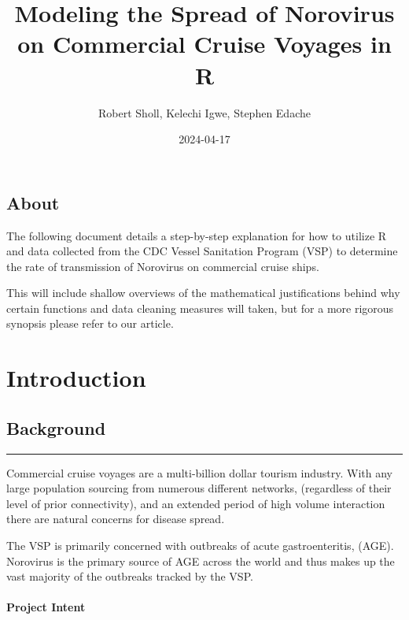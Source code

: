 \documentclass[
  11,
]{book}
\title{Modeling the Spread of Norovirus on Commercial Cruise Voyages in R}
\author{Robert Sholl, Kelechi Igwe, Stephen Edache}
\date{2024-04-17}
\begin{document}
\maketitle

{
\setcounter{tocdepth}{2}
\tableofcontents
}
\hypertarget{about}{%
\chapter*{About}\label{about}}


The following document details a step-by-step explanation for how to utilize R and data collected from the CDC Vessel Sanitation Program (VSP) to determine the rate of transmission of Norovirus on commercial cruise ships.

This will include shallow overviews of the mathematical justifications behind why certain functions and data cleaning measures will taken, but for a more rigorous synopsis please refer to our article.

\hypertarget{part-introduction}{%
\part{Introduction}\label{part-introduction}}

\hypertarget{background}{%
\chapter*{Background}\label{background}}


\begin{center}\rule{0.5\linewidth}{0.5pt}\end{center}

Commercial cruise voyages are a multi-billion dollar tourism industry. With any large population sourcing from numerous different networks, (regardless of their level of prior connectivity), and an extended period of high volume interaction there are natural concerns for disease spread.

The VSP is primarily concerned with outbreaks of acute gastroenteritis, (AGE). Norovirus is the primary source of AGE across the world and thus makes up the vast majority of the outbreaks tracked by the VSP.

\hypertarget{project-intent}{%
\subsection*{Project Intent}\label{project-intent}}
\end{document}
